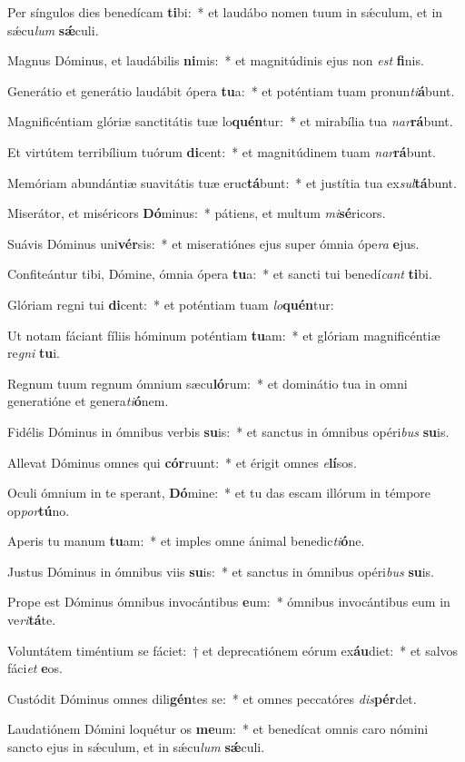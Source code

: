 \item Per síngulos dies benedícam \textbf{ti}bi:~* et laudábo nomen tuum in sǽculum, et in sǽcu\textit{lum} \textbf{sǽ}culi.
\item Magnus Dóminus, et laudábilis \textbf{ni}mis:~* et magnitúdinis ejus non \textit{est} \textbf{fi}nis.
\item Generátio et generátio laudábit ópera \textbf{tu}a:~* et poténtiam tuam pronun\textit{ti}\textbf{á}bunt.
\item Magnificéntiam glóriæ sanctitátis tuæ lo\textbf{quén}tur:~* et mirabília tua \textit{nar}\textbf{rá}bunt.
\item Et virtútem terribílium tuórum \textbf{di}cent:~* et magnitúdinem tuam \textit{nar}\textbf{rá}bunt.
\item Memóriam abundántiæ suavitátis tuæ eruc\textbf{tá}bunt:~* et justítia tua ex\textit{sul}\textbf{tá}bunt.
\item Miserátor, et miséricors \textbf{Dó}minus:~* pátiens, et multum \textit{mi}\textbf{sé}ricors.
\item Suávis Dóminus uni\textbf{vér}sis:~* et miseratiónes ejus super ómnia ópe\textit{ra} \textbf{e}jus.
\item Confiteántur tibi, Dómine, ómnia ópera \textbf{tu}a:~* et sancti tui benedí\textit{cant} \textbf{ti}bi.
\item Glóriam regni tui \textbf{di}cent:~* et poténtiam tuam \textit{lo}\textbf{quén}tur:
\item Ut notam fáciant fíliis hóminum poténtiam \textbf{tu}am:~* et glóriam magnificéntiæ re\textit{gni} \textbf{tu}i.
\item Regnum tuum regnum ómnium sæcu\textbf{ló}rum:~* et dominátio tua in omni generatióne et genera\textit{ti}\textbf{ó}nem.
\item Fidélis Dóminus in ómnibus verbis \textbf{su}is:~* et sanctus in ómnibus opéri\textit{bus} \textbf{su}is.
\item Allevat Dóminus omnes qui \textbf{cór}ruunt:~* et érigit omnes \textit{e}\textbf{lí}sos.
\item Oculi ómnium in te sperant, \textbf{Dó}mine:~* et tu das escam illórum in témpore op\textit{por}\textbf{tú}no.
\item Aperis tu manum \textbf{tu}am:~* et imples omne ánimal benedic\textit{ti}\textbf{ó}ne.
\item Justus Dóminus in ómnibus viis \textbf{su}is:~* et sanctus in ómnibus opéri\textit{bus} \textbf{su}is.
\item Prope est Dóminus ómnibus invocántibus \textbf{e}um:~* ómnibus invocántibus eum in ve\textit{ri}\textbf{tá}te.
\item Voluntátem timéntium se fáciet:~† et deprecatiónem eórum ex\textbf{áu}diet:~* et salvos fáci\textit{et} \textbf{e}os.
\item Custódit Dóminus omnes dili\textbf{gén}tes se:~* et omnes peccatóres \textit{dis}\textbf{pér}det.
\item Laudatiónem Dómini loquétur os \textbf{me}um:~* et benedícat omnis caro nómini sancto ejus in sǽculum, et in sǽcu\textit{lum} \textbf{sǽ}culi.
